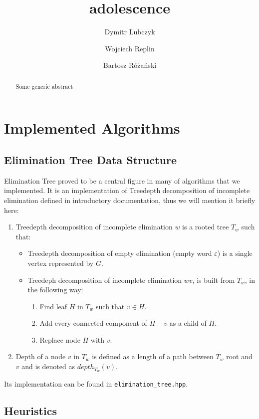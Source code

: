 \documentclass[a4paper]{article}
\title{adolescence}
\author{Dymitr Lubczyk \and Wojciech Replin \and Bartosz Różański}
\begin{document}
	\maketitle
	\begin{abstract}
		Some generic abstract
	\end{abstract}
	
	\newpage
	\section{Implemented Algorithms}
	\subsection{Elimination Tree Data Structure}
	Elimination Tree proved to be a central figure in many of algorithms that we implemented. It is an implementation of Treedepth decomposition of incomplete elimination defined in introductory documentation, thus we will mention it briefly here:
	\begin{enumerate}
		\item Treedepth decomposition of incomplete elimination $w$ is a rooted tree $T_w$ such that:
		\begin{itemize}
			\item Treedepth decomposition of empty elimination (empty word $\varepsilon$) is a single vertex represented by $G$.
			\item Treedeph decomposition of incomplete elimination $wv$, is built from $T_w$, in the following way:
			\begin{enumerate}
				\item Find leaf $H$ in $T_w$ such that $v\in H$.
				\item Add every connected component of $H-v$ as a child of $H$.
				\item Replace node $H$ with $v$.
			\end{enumerate}
		\end{itemize}
		\item Depth of a node $v$ in $T_w$ is defined as a length of a path between $T_w$ root and $v$ and is denoted as $depth_{T_w}\left(v\right)$.
	\end{enumerate}
	Its implementation can be found in \texttt{elimination\_tree.hpp}.
	\subsection{Heuristics}
\end{document}
